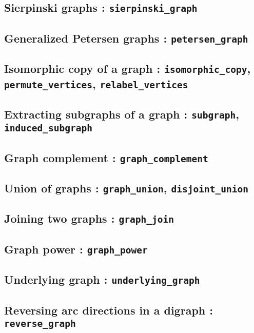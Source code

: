 \documentclass[a4paper,11pt]{article}
\begin{document}
\subsection{Sierpinski graphs : {\tt sierpinski\_graph}}

\subsection{Generalized Petersen graphs : {\tt petersen\_graph}}

\subsection{Isomorphic copy of a graph : {\tt isomorphic\_copy}, {\tt permute\_vertices}, {\tt relabel\_vertices}}

\subsection{Extracting subgraphs of a graph : {\tt subgraph}, {\tt induced\_subgraph}}

\subsection{Graph complement : {\tt graph\_complement}}

\subsection{Union of graphs : {\tt graph\_union}, {\tt disjoint\_union}}

\subsection{Joining two graphs : {\tt graph\_join}}

\subsection{Graph power : {\tt graph\_power}}

\subsection{Underlying graph : {\tt underlying\_graph}}

\subsection{Reversing arc directions in a digraph : {\tt reverse\_graph}}
\end{document}
